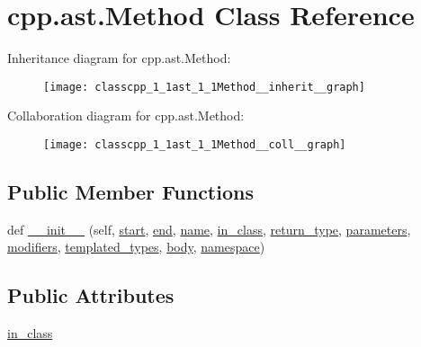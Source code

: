 \hypertarget{classcpp_1_1ast_1_1Method}{}\section{cpp.\+ast.\+Method Class Reference}
\label{classcpp_1_1ast_1_1Method}


Inheritance diagram for cpp.\+ast.\+Method\+:
\nopagebreak
\begin{figure}[H]
\begin{center}
\leavevmode
\texttt{[image: classcpp\_1\_1ast\_1\_1Method\_\_inherit\_\_graph]}
\end{center}
\end{figure}


Collaboration diagram for cpp.\+ast.\+Method\+:
\nopagebreak
\begin{figure}[H]
\begin{center}
\leavevmode
\texttt{[image: classcpp\_1\_1ast\_1\_1Method\_\_coll\_\_graph]}
\end{center}
\end{figure}
\subsection*{Public Member Functions}
\begin{DoxyCompactItemize}
\item 
def \hyperlink{classcpp_1_1ast_1_1Method_aa3cbdc9c4b7e92b15fa6acea0dbf2322}{\+\_\+\+\_\+init\+\_\+\+\_\+} (self, \hyperlink{classcpp_1_1ast_1_1Node_a7b2aa97e6a049bb1a93aea48c48f1f44}{start}, \hyperlink{classcpp_1_1ast_1_1Node_a3c5e5246ccf619df28eca02e29d69647}{end}, \hyperlink{classcpp_1_1ast_1_1__GenericDeclaration_af774f4729dfd78d0538a6782fe8514c1}{name}, \hyperlink{classcpp_1_1ast_1_1Method_aa67244c3673afed43398b5d3e3fa6c1c}{in\+\_\+class}, \hyperlink{classcpp_1_1ast_1_1Function_af750fd788d7ab33163ee066534780212}{return\+\_\+type}, \hyperlink{classcpp_1_1ast_1_1Function_a0e61ef47af9cf2fd4402dbd8cab631ef}{parameters}, \hyperlink{classcpp_1_1ast_1_1Function_ad30eed435f1ff9ff34ade9cc0d7be121}{modifiers}, \hyperlink{classcpp_1_1ast_1_1Function_a57bb03218bade3240137a0d91c467cb6}{templated\+\_\+types}, \hyperlink{classcpp_1_1ast_1_1Function_a8e25e5016b23b38e32acf2df529c0650}{body}, \hyperlink{classcpp_1_1ast_1_1__GenericDeclaration_a8aee3f11b37449d54b42a78e0a689f46}{namespace})
\end{DoxyCompactItemize}
\subsection*{Public Attributes}
\begin{DoxyCompactItemize}
\item 
\hyperlink{classcpp_1_1ast_1_1Method_aa67244c3673afed43398b5d3e3fa6c1c}{in\+\_\+class}
\end{DoxyCompactItemize}


